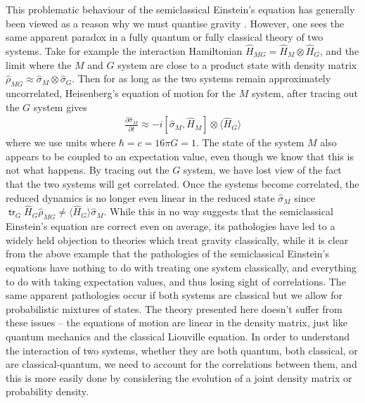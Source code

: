 \documentclass[aps,pra,showpacs,citeautoscript,amsmath,amssymb,floatfix,superscriptaddress,bbm, verbatim,amsfonts,changes,11pt,nofootinbib,longbibliography]{revtex4-2}
\newcommand{\tr}{\mathop{\mathsf{tr}}\nolimits}
\begin{document}
This problematic behaviour of the semiclassical Einstein's equation has generally been viewed as a reason why we must quantise gravity \cite{dewitt1953new,duff1980inconsistency,unruh1984steps,carlip2008quantum}. However, one sees the same apparent paradox in a fully quantum or fully classical theory of two systems. Take for example the interaction Hamiltonian $\hat{H}_{MG}=\hat{H}_M\otimes \hat{H}_G$, and the limit where the $M$ and $G$ system are close to a product state with density matrix $\hat{\rho}_{MG}\approx\hat{\sigma}_M\otimes\hat{\sigma}_G$.
Then for as long as the two systems remain approximately uncorrelated, Heisenberg's equation of motion for the $M$ system, after tracing out the $G$ system gives
\begin{align}
\frac{\partial \hat{\sigma}_M}{\partial t}\approx -i[\hat{\sigma}_M,\hat{H}_M]\otimes\langle \hat{H}_G \rangle
\label{eq:homer-semi}
\end{align}
where we use units where $\hbar=c=16\pi G=1$.
The state of the system $M$ also appears to be coupled to an expectation value, even though we know that this is not what happens. By tracing out the $G$ system, we have lost view of the fact that the two systems will get correlated. Once the systems become correlated, the reduced dynamics is no longer even linear in the reduced state $\hat{\sigma}_M$ since $\tr_G \hat{H}_G\hat{\rho}_{MG}\neq \langle \hat{H}_G\rangle\hat{\sigma}_M$. 
While this in no way suggests that the semiclassical Einstein's equation are correct even on average, its pathologies have led to a widely held objection to theories which treat gravity classically, while it is clear from the above example that the pathologies of the semiclassical Einstein's equations have nothing to do with treating one system classically, and everything to do with taking expectation values, and thus losing sight of correlations. The same apparent pathologies occur if both systems are classical but we allow for probabilistic mixtures of states. The theory presented here doesn't suffer from these issues -- the equations of motion are linear in the density matrix, just like quantum mechanics and the classical Liouville equation.  In order to understand the interaction of two systems, whether they are both quantum, both classical, or are classical-quantum, we need to account for the correlations between them, and this is more easily done by considering the evolution of a joint density matrix or probability density.
\end{document}
